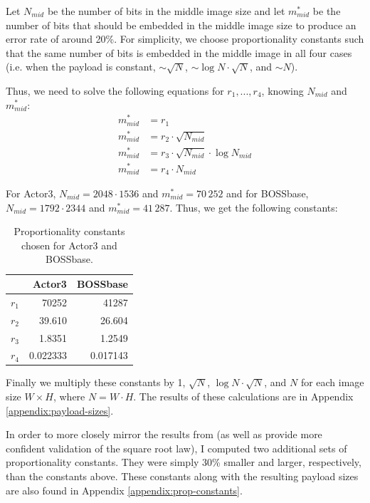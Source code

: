 \documentclass[11pt,a4paper,twoside,openright]{report}
\begin{document}
Let $N_{mid}$ be the number of bits in the middle image size and let $m_{mid}^{\ast}$ be the number of bits that should be embedded in the middle image size to produce an error rate of around 20\%. For simplicity, we choose proportionality constants such that the same number of bits is embedded in the middle image in all four cases (i.e. when the payload is constant, $\sim \sqrt{N}$, $\sim \log{N} \cdot \sqrt{N}$, and $\sim N$).

Thus, we need to solve the following equations for $r_1,...,r_4$, knowing $N_{mid}$ and $m_{mid}^{\ast}$:
    \begin{align*}
    m^{\ast}_{mid} &= r_1 \\
    m^{\ast}_{mid} &= r_2 \cdot \sqrt{N_{mid}} \\
    m^{\ast}_{mid} &= r_3 \cdot \sqrt{N_{mid}} \cdot \log N_{mid} \\
    m^{\ast}_{mid} &= r_4 \cdot N_{mid}
    \end{align*}

For Actor3, $N_{mid} = 2048\cdot1536$ and $m_{mid}^{\ast}=70\,252$ and for BOSSbase, $N_{mid} = 1792 \cdot 2344$ and $m_{mid}^{\ast}=41\,287$. Thus, we get the following constants:

\begin{table}[htbp]
    \begin{center}
        \begin{tabular}{ r | r  r}
        & Actor3 & BOSSbase \\ \hline
        $r_1$ & 70252 & 41287 \\
        $r_2$ & 39.610 & 26.604 \\
        $r_3$ & 1.8351 & 1.2549 \\
        $r_4$ & 0.022333 & 0.017143 \\
        \end{tabular}
        \caption{Proportionality constants chosen for Actor3 and BOSSbase.}
        \label{fig:prop-constants}
    \end{center}
\end{table}

Finally we multiply these constants by 1, $\sqrt{N}$, $\log{N} \cdot \sqrt{N}$, and $N$ for each image size $W \times H$, where $N = W \cdot H$. The results of these calculations are in Appendix \ref{appendix:payload-sizes}.

In order to more closely mirror the results from \cite{2008-paper} (as well as provide more confident validation of the square root law), I computed two additional sets of proportionality constants. They were simply 30\% smaller and larger, respectively, than the constants above. These constants along with the resulting payload sizes are also found in Appendix \ref{appendix:prop-constants}.
\end{document}
